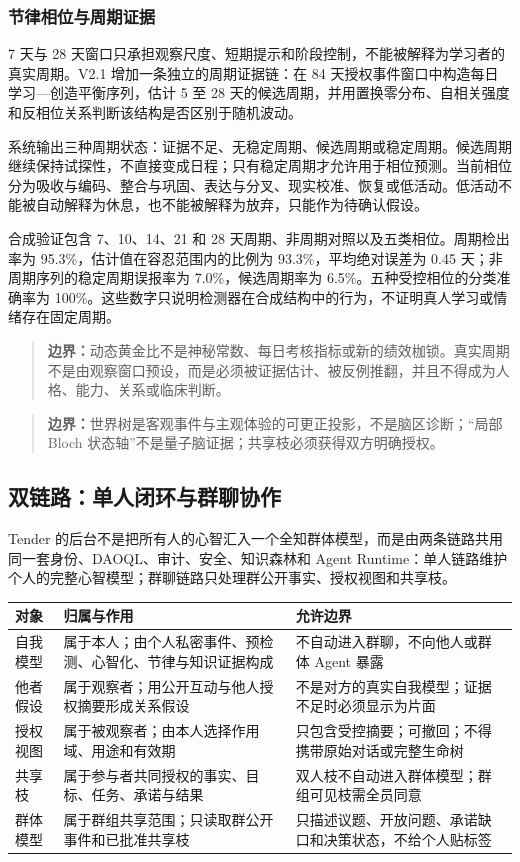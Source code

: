\documentclass[UTF8,a4paper,11pt]{ctexart}
\newcommand{\boundary}[1]{\begin{quote}\noindent\textbf{\color{TenderPink}边界：}#1\end{quote}}
\begin{document}
\subsubsection{节律相位与周期证据}

7 天与 28 天窗口只承担观察尺度、短期提示和阶段控制，不能被解释为学习者的真实周期。V2.1 增加一条独立的周期证据链：在 84 天授权事件窗口中构造每日学习—创造平衡序列，估计 5 至 28 天的候选周期，并用置换零分布、自相关强度和反相位关系判断该结构是否区别于随机波动。

系统输出三种周期状态：证据不足、无稳定周期、候选周期或稳定周期。候选周期继续保持试探性，不直接变成日程；只有稳定周期才允许用于相位预测。当前相位分为吸收与编码、整合与巩固、表达与分叉、现实校准、恢复或低活动。低活动不能被自动解释为休息，也不能被解释为放弃，只能作为待确认假设。

合成验证包含 7、10、14、21 和 28 天周期、非周期对照以及五类相位。周期检出率为 95.3\%，估计值在容忍范围内的比例为 93.3\%，平均绝对误差为 0.45 天；非周期序列的稳定周期误报率为 7.0\%，候选周期率为 6.5\%。五种受控相位的分类准确率为 100\%。这些数字只说明检测器在合成结构中的行为，不证明真人学习或情绪存在固定周期。

\boundary{动态黄金比不是神秘常数、每日考核指标或新的绩效枷锁。真实周期不是由观察窗口预设，而是必须被证据估计、被反例推翻，并且不得成为人格、能力、关系或临床判断。}

\boundary{世界树是客观事件与主观体验的可更正投影，不是脑区诊断；“局部 Bloch 状态轴”不是量子脑证据；共享枝必须获得双方明确授权。}

\subsection{双链路：单人闭环与群聊协作}

Tender 的后台不是把所有人的心智汇入一个全知群体模型，而是由两条链路共用同一套身份、DAOQL、审计、安全、知识森林和 Agent Runtime：单人链路维护个人的完整心智模型；群聊链路只处理群公开事实、授权视图和共享枝。

\begin{center}
\begin{longtable}{@{}p{3.2cm}p{4.8cm}p{5.0cm}@{}}
\toprule
\textbf{对象} & \textbf{归属与作用} & \textbf{允许边界} \\
\midrule
自我模型 & 属于本人；由个人私密事件、预检测、心智化、节律与知识证据构成 & 不自动进入群聊，不向他人或群体 Agent 暴露 \\
他者假设 & 属于观察者；用公开互动与他人授权摘要形成关系假设 & 不是对方的真实自我模型；证据不足时必须显示为片面 \\
授权视图 & 属于被观察者；由本人选择作用域、用途和有效期 & 只包含受控摘要；可撤回；不得携带原始对话或完整生命树 \\
共享枝 & 属于参与者共同授权的事实、目标、任务、承诺与结果 & 双人枝不自动进入群体模型；群组可见枝需全员同意 \\
群体模型 & 属于群组共享范围；只读取群公开事件和已批准共享枝 & 只描述议题、开放问题、承诺缺口和决策状态，不给个人贴标签 \\
\bottomrule
\end{longtable}
\end{center}
\end{document}

